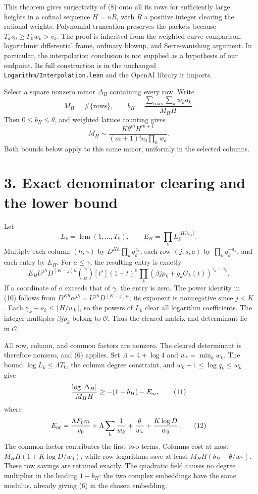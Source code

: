 \documentclass[11pt]{article}
\begin{document}
This theorem gives surjectivity of (8) onto all its rows for
sufficiently large heights in a cofinal sequence \(H=nR\), with \(R\) a
positive integer clearing the rational weights. Polynomial truncation
preserves the packets because \(T_kv_0\ge F_0w_k>v_k\). The proof is
inherited from the weighted curve comparison, logarithmic differential
frame, ordinary blowup, and Serre-vanishing argument. In particular, the
interpolation conclusion is not supplied as a hypothesis of our
endpoint. Its full construction is in the unchanged
\texttt{Logarithm/Interpolation.lean} and the OpenAI library it imports.

Select a square nonzero minor \(\Delta_H\) containing every row. Write
\[
M_H=\#\{\text{rows}\},\qquad
b_H=\frac{\sum_{\mathrm{rows}}\sum_kw_ka_k}{M_HH}.
\] Then \(0\le b_H\le\theta\), and weighted lattice counting gives \[
M_H\sim\frac{K\theta^m H^{m+1}}{(m+1)!v_0\prod_kw_k}.
\tag{9}
\] Both bounds below apply to this same minor, uniformly in the selected
columns.

\section{3. Exact denominator clearing and the lower
bound}\label{exact-denominator-clearing-and-the-lower-bound}

Let \[
L_k=\operatorname{lcm}(1,\ldots,T_k),\qquad
E_H=\prod_kL_k^{\lfloor H/w_k\rfloor}.
\] Multiply each column \((h,\gamma)\) by
\(D^{Kh}\prod_kq_k^{\gamma_k}\), each row \((j,s,a)\) by
\(\prod_kq_k^{-a_k}\), and each entry by \(E_H\). For \(a\le\gamma\),
the resulting entry is exactly \[
E_H U^{jh}D^{(K-j)h}\binom\gamma a
[t^s](1+t)^h
\prod_k(\beta jp_k+q_kG_k(t))^{\gamma_k-a_k}.
\tag{10}
\] If a coordinate of \(a\) exceeds that of \(\gamma\), the entry is
zero. The power identity in (10) follows from
\(D^{Kh}\alpha^{jh}=U^{jh}D^{(K-j)h}\); its exponent is nonnegative
since \(j<K\). Each \(\gamma_k-a_k\le\lfloor H/w_k\rfloor\), so the
powers of \(L_k\) clear all logarithm coefficients. The integer
multiples \(\beta jp_k\) belong to \(\mathcal O\). Thus the cleared
matrix and determinant lie in \(\mathcal O\).

All row, column, and common factors are nonzero. The cleared determinant
is therefore nonzero, and (6) applies. Set \(\Lambda=4+\log4\) and
\(w_* =\min_kw_k\). The bound \(\log L_k\le\Lambda T_k\), the column
degree constraint, and \(w_k-1\le\log q_k\le w_k\) give \[
\frac{\log|\Delta_H|}{M_HH}\ge -(1-b_H)-E_{\rm ar},
\tag{11}
\] where \[
E_{\rm ar}=\frac{\Lambda F_0m}{v_0}
+\Lambda\sum_k\frac1{w_k}+\frac\theta{w_*}
+\frac{K\log D}{w_0}.
\tag{12}
\] The common factor contributes the first two terms. Columns cost at
most \(M_HH(1+K\log D/w_0)\), while row logarithms save at least
\(M_HH(b_H-\theta/w_*)\). These row savings are retained exactly. The
quadratic field causes no degree multiplier in the leading \(1-b_H\):
the two complex embeddings have the same modulus, already giving (6) in
the chosen embedding.
\end{document}
